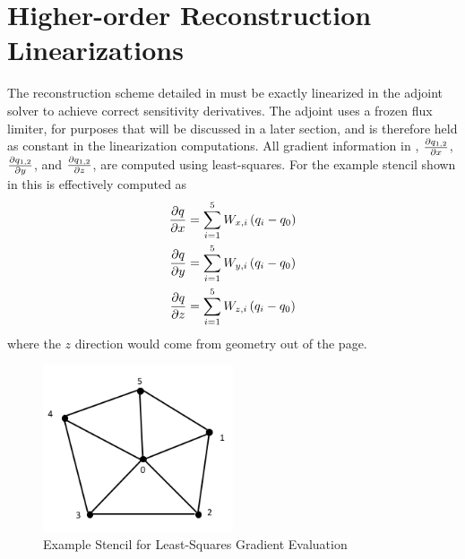 \section{Higher-order Reconstruction Linearizations}
\label{sec:higher-order-linearizations}

The reconstruction scheme detailed in  must
be exactly linearized in the adjoint solver to achieve correct sensitivity
derivatives. The adjoint uses a frozen flux limiter, for purposes that will be
discussed in a later section, and is therefore held as constant in the
linearization computations.  All gradient information in ,
$\frac{\partial q_{1,2}}{\partial x}$, $\frac{\partial q_{1,2}}{\partial y}$, and $\frac{\partial q_{1,2}}{\partial z}$, are computed using
least-squares.  For the example stencil shown in  this
is effectively computed as
\begin{equation}
  \begin{aligned}
    \frac{\partial q}{\partial x} &= \sum_{i=1}^{5}{W_{x,i}\left( q_i - q_0 \right)} \\
    \frac{\partial q}{\partial y} &= \sum_{i=1}^{5}{W_{y,i}\left( q_i - q_0 \right)} \\
    \frac{\partial q}{\partial z} &= \sum_{i=1}^{5}{W_{z,i}\left( q_i - q_0 \right)}
  \end{aligned}
  \label{grad-construction}
\end{equation}
where the $z$ direction would come from geometry out of the page.
\begin{figure}[h]
  \centering
  \includegraphics[width=0.5\textwidth]{figures/stencil.png}
  \caption{Example Stencil for Least-Squares Gradient Evaluation}
  \label{fig:lsq-gradients}
\end{figure}
